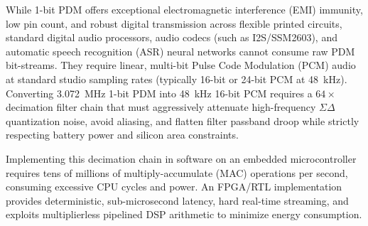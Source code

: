 \documentclass[11pt,a4paper]{article}
\begin{document}
While 1-bit PDM offers exceptional electromagnetic interference (EMI) immunity, low pin count, and robust digital transmission across flexible printed circuits, standard digital audio processors, audio codecs (such as I2S/SSM2603), and automatic speech recognition (ASR) neural networks cannot consume raw PDM bit-streams. They require linear, multi-bit Pulse Code Modulation (PCM) audio at standard studio sampling rates (typically 16-bit or 24-bit PCM at 48~kHz). Converting 3.072~MHz 1-bit PDM into 48~kHz 16-bit PCM requires a $64\times$ decimation filter chain that must aggressively attenuate high-frequency $\Sigma\Delta$ quantization noise, avoid aliasing, and flatten filter passband droop while strictly respecting battery power and silicon area constraints.

Implementing this decimation chain in software on an embedded microcontroller requires tens of millions of multiply-accumulate (MAC) operations per second, consuming excessive CPU cycles and power. An FPGA/RTL implementation provides deterministic, sub-microsecond latency, hard real-time streaming, and exploits multiplierless pipelined DSP arithmetic to minimize energy consumption.
\end{document}
